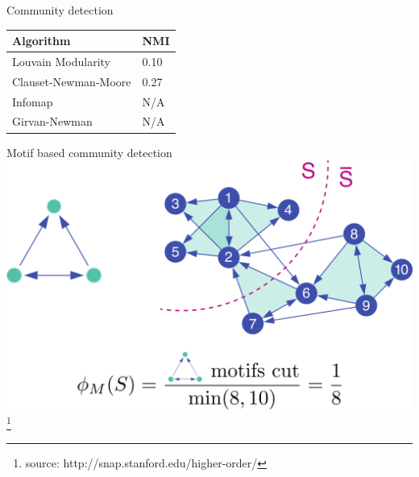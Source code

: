 \documentclass[unknownkeysallowed]{beamer}
\begin{document}
\begin{frame}{Community detection}

  \centering
  \begin{tabular}{l|l}
    Algorithm & NMI \\ \hline
    Louvain Modularity & 0.10 \\
    Clauset-Newman-Moore & 0.27 \\
    Infomap & N/A \\
    Girvan-Newman & N/A
  \end{tabular}

\end{frame}

\begin{frame}{Motif based community detection}
  \includegraphics[width=\textwidth]{benson}
  \footnote{source: http://snap.stanford.edu/higher-order/}
\end{frame}
\end{document}
